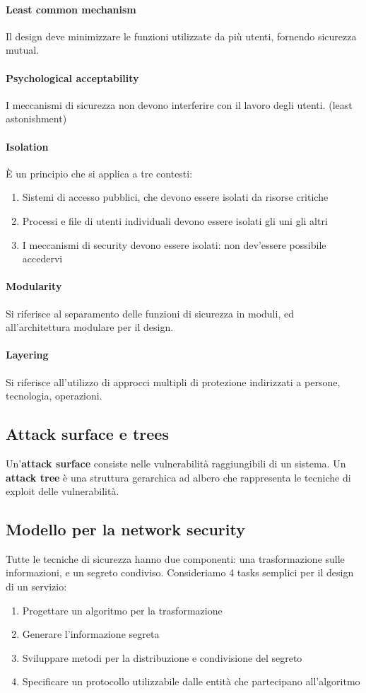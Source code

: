 \documentclass[11pt]{article}
\begin{document}
\paragraph{Least common mechanism} Il design deve minimizzare le funzioni utilizzate da più utenti, fornendo sicurezza mutual.
\paragraph{Psychological acceptability} I meccanismi di sicurezza non devono interferire con il lavoro degli utenti. (least astonishment)
\paragraph{Isolation} È un principio che si applica a tre contesti: 
\begin{enumerate}
    \item Sistemi di accesso pubblici, che devono essere isolati da risorse critiche
    \item Processi e file di utenti individuali devono essere isolati gli uni gli altri 
    \item I meccanismi di security devono essere isolati: non dev'essere possibile accedervi
\end{enumerate} 
\paragraph{Modularity} Si riferisce al separamento delle funzioni di sicurezza in moduli, ed all'architettura modulare per il design.
\paragraph{Layering} Si riferisce all'utilizzo di approcci multipli di protezione indirizzati a persone, tecnologia, operazioni.
\subsection{Attack surface e trees}
Un'\textbf{attack surface} consiste nelle vulnerabilità raggiungibili di un sistema. Un \textbf{attack tree} è una struttura gerarchica ad albero che rappresenta le tecniche di exploit delle vulnerabilità. 
\subsection{Modello per la network security}
Tutte le tecniche di sicurezza hanno due componenti: una trasformazione sulle informazioni, e un segreto condiviso. Consideriamo 4 tasks semplici per il design di un servizio:
\begin{enumerate}
    \item Progettare un algoritmo per la trasformazione 
    \item Generare l'informazione segreta
    \item Sviluppare metodi per la distribuzione e condivisione del segreto
    \item Specificare un protocollo utilizzabile dalle entità che partecipano all'algoritmo
\end{enumerate}
\end{document}
